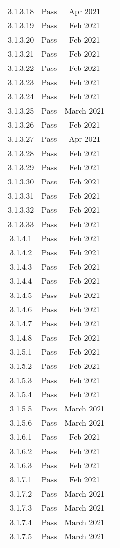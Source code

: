 \documentclass[12pt, titlepage]{article}
\begin{document}
\begin{center}
{\begin{longtable}{ |c|c|c|c| }
3.1.3.18 & Pass & Apr 2021\\
3.1.3.19 & Pass & Feb 2021\\
3.1.3.20 & Pass & Feb 2021\\
3.1.3.21 & Pass & Feb 2021\\
3.1.3.22 & Pass & Feb 2021\\
3.1.3.23 & Pass & Feb 2021\\
3.1.3.24 & Pass & Feb 2021\\
3.1.3.25 & Pass & March 2021\\
3.1.3.26 & Pass & Feb 2021\\
3.1.3.27 & Pass & Apr 2021\\
3.1.3.28 & Pass & Feb 2021\\
3.1.3.29 & Pass & Feb 2021\\
3.1.3.30 & Pass & Feb 2021\\
3.1.3.31 & Pass & Feb 2021\\
3.1.3.32 & Pass & Feb 2021\\
3.1.3.33 & Pass & Feb 2021\\
3.1.4.1 & Pass & Feb 2021\\
3.1.4.2 & Pass & Feb 2021\\
3.1.4.3 & Pass & Feb 2021\\
3.1.4.4 & Pass & Feb 2021\\
3.1.4.5 & Pass & Feb 2021\\
3.1.4.6 & Pass & Feb 2021\\
3.1.4.7 & Pass & Feb 2021\\
3.1.4.8 & Pass & Feb 2021\\
3.1.5.1 & Pass & Feb 2021\\
3.1.5.2 & Pass & Feb 2021\\
3.1.5.3 & Pass & Feb 2021\\
3.1.5.4 & Pass & Feb 2021\\
3.1.5.5 & Pass & March 2021\\
3.1.5.6 & Pass & March 2021\\
3.1.6.1 & Pass & Feb 2021\\
3.1.6.2 & Pass & Feb 2021\\
3.1.6.3 & Pass & Feb 2021\\
3.1.7.1 & Pass & Feb 2021\\
3.1.7.2 & Pass & March 2021\\
3.1.7.3 & Pass & March 2021\\
3.1.7.4 & Pass & March 2021\\
3.1.7.5 & Pass & March 2021\\

\end{longtable}}
\end{center}
\end{document}
